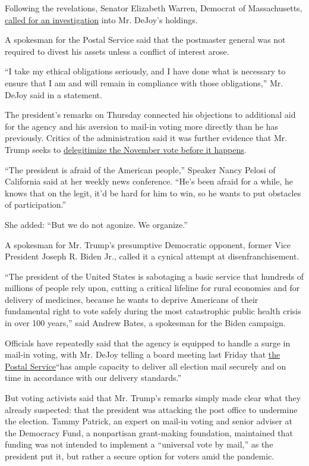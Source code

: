 Following the revelations, Senator Elizabeth Warren, Democrat of
Massachusetts,
\href{https://twitter.com/SenWarren/status/1293956521920012289}{called
for an investigation} into Mr. DeJoy's holdings.

A spokesman for the Postal Service said that the postmaster general was
not required to divest his assets unless a conflict of interest arose.

``I take my ethical obligations seriously, and I have done what is
necessary to ensure that I am and will remain in compliance with those
obligations,'' Mr. DeJoy said in a statement.

The president's remarks on Thursday connected his objections to
additional aid for the agency and his aversion to mail-in voting more
directly than he has previously. Critics of the administration said it
was further evidence that Mr. Trump seeks to
\href{https://www.nytimes3xbfgragh.onion/2020/07/31/us/politics/trump-tweet-democracy.html}{delegitimize
the November vote before it happens}.

``The president is afraid of the American people,'' Speaker Nancy Pelosi
of California said at her weekly news conference. ``He's been afraid for
a while, he knows that on the legit, it'd be hard for him to win, so he
wants to put obstacles of participation.''

She added: ``But we do not agonize. We organize.''

A spokesman for Mr. Trump's presumptive Democratic opponent, former Vice
President Joseph R. Biden Jr., called it a cynical attempt at
disenfranchisement.

``The president of the United States is sabotaging a basic service that
hundreds of millions of people rely upon, cutting a critical lifeline
for rural economies and for delivery of medicines, because he wants to
deprive Americans of their fundamental right to vote safely during the
most catastrophic public health crisis in over 100 years,'' said Andrew
Bates, a spokesman for the Biden campaign.

Officials have repeatedly said that the agency is equipped to handle a
surge in mail-in voting, with Mr. DeJoy telling a board meeting last
Friday that
\href{https://about.usps.com/newsroom/national-releases/2020/0807-pmg-bog-meeting-comments.htm}{the
Postal Service}``has ample capacity to deliver all election mail
securely and on time in accordance with our delivery standards.''

But voting activists said that Mr. Trump's remarks simply made clear
what they already suspected: that the president was attacking the post
office to undermine the election. Tammy Patrick, an expert on mail-in
voting and senior adviser at the Democracy Fund, a nonpartisan
grant-making foundation, maintained that funding was not intended to
implement a ``universal vote by mail,'' as the president put it, but
rather a secure option for voters amid the pandemic.

